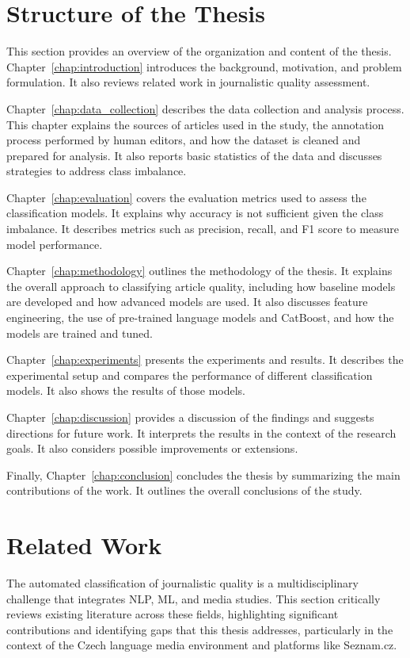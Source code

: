 \section{Structure of the Thesis}
This section provides an overview of the organization and content of the thesis. Chapter~\ref{chap:introduction} introduces the background, motivation, and problem formulation. It also reviews related work in journalistic quality assessment. 

Chapter~\ref{chap:data_collection} describes the data collection and analysis process. This chapter explains the sources of articles used in the study, the annotation process performed by human editors, and how the dataset is cleaned and prepared for analysis. It also reports basic statistics of the data and discusses strategies to address class imbalance. 

Chapter~\ref{chap:evaluation} covers the evaluation metrics used to assess the classification models. It explains why accuracy is not sufficient given the class imbalance. It describes metrics such as precision, recall, and F1 score to measure model performance. 

Chapter~\ref{chap:methodology} outlines the methodology of the thesis. It explains the overall approach to classifying article quality, including how baseline models are developed and how advanced models are used. It also discusses feature engineering, the use of pre-trained language models and \ac{CatBoost}, and how the models are trained and tuned. 

Chapter~\ref{chap:experiments} presents the experiments and results. It describes the experimental setup and compares the performance of different classification models. It also shows the results of those models. 

Chapter~\ref{chap:discussion} provides a discussion of the findings and suggests directions for future work. It interprets the results in the context of the research goals. It also considers possible improvements or extensions. 

Finally, Chapter~\ref{chap:conclusion} concludes the thesis by summarizing the main contributions of the work. It outlines the overall conclusions of the study.

\clearpage
\section{Related Work}

The automated classification of journalistic quality is a multidisciplinary challenge that integrates \ac{NLP}, \ac{ML}, and media studies. This section critically reviews existing literature across these fields, highlighting significant contributions and identifying gaps that this thesis addresses, particularly in the context of the Czech language media environment and platforms like Seznam.cz.


